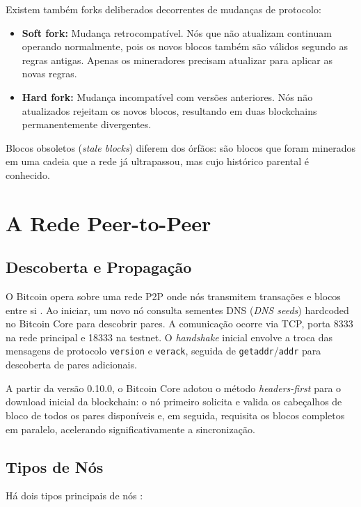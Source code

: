 \documentclass[12pt,a4paper]{report}
\begin{document}
Existem também forks deliberados decorrentes de mudanças de protocolo:

\begin{itemize}
    \item \textbf{Soft fork:} Mudança retrocompatível. Nós que não atualizam continuam operando normalmente, pois os novos blocos também são válidos segundo as regras antigas. Apenas os mineradores precisam atualizar para aplicar as novas regras.
    \item \textbf{Hard fork:} Mudança incompatível com versões anteriores. Nós não atualizados rejeitam os novos blocos, resultando em duas blockchains permanentemente divergentes.
\end{itemize}

Blocos obsoletos (\textit{stale blocks}) diferem dos órfãos: são blocos que foram minerados em uma cadeia que a rede já ultrapassou, mas cujo histórico parental é conhecido.

\section{A Rede Peer-to-Peer}

\subsection{Descoberta e Propagação}

O Bitcoin opera sobre uma rede P2P onde nós transmitem transações e blocos entre si \cite{Bashir2023}. Ao iniciar, um novo nó consulta sementes DNS (\textit{DNS seeds}) hardcoded no Bitcoin Core para descobrir pares. A comunicação ocorre via TCP, porta 8333 na rede principal e 18333 na testnet. O \textit{handshake} inicial envolve a troca das mensagens de protocolo \texttt{version} e \texttt{verack}, seguida de \texttt{getaddr}/\texttt{addr} para descoberta de pares adicionais.

A partir da versão 0.10.0, o Bitcoin Core adotou o método \textit{headers-first} para o download inicial da blockchain: o nó primeiro solicita e valida os cabeçalhos de bloco de todos os pares disponíveis e, em seguida, requisita os blocos completos em paralelo, acelerando significativamente a sincronização.

\subsection{Tipos de Nós}

Há dois tipos principais de nós \cite{Bashir2023}:
\end{document}
